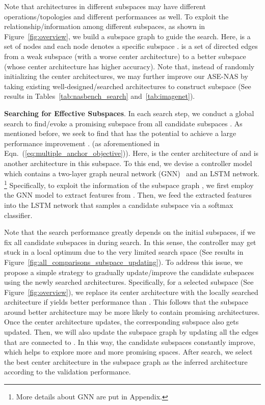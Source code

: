 \documentclass[lettersize,journal]{IEEEtran}
\newcommand{\sexyname}{ASE-NAS\xspace}
\begin{document}
Note that architectures in different subspaces may have different operations/topologies and different performances as well.
To exploit the relationship/information among different subspaces, as shown in Figure~\ref{fig:overview}, we build a subspace graph  to guide the search. 
Here,  is a set of nodes and each node denotes a specific subspace . 
 is a set of directed edges from a weak subspace (with a worse center architecture) to a better subspace (whose center architecture has higher accuracy). 
Note that, instead of randomly initializing the center architectures, we may further improve our \sexyname by taking existing well-designed/searched architectures to construct subspace (See results in Tables~\ref{tab:nasbench_search} and~\ref{tab:imagenet}).



\textbf{Searching for Effective Subspaces}.
In each search step, we conduct a global search to find/evoke a promising subspace  from all candidate subspaces . As mentioned before, we seek to find  that has the potential to achieve a large performance improvement . 
(as aforementioned in Eqn.~(\ref{eq:multiple_anchor_objective})). 
Here,  is the center architecture of  and  is another architecture in this subspace. To this end,  
we devise a controller model which contains a two-layer graph neural network (GNN)~\cite{you2020handling} and an LSTM network.
\footnote{More details about GNN are put in Appendix.}
Specifically, to exploit the information of the subspace graph ,
we first employ the GNN model to extract features from . Then, we feed the extracted features into the LSTM network that samples a candidate subspace  via a softmax classifier. 

Note that the search performance greatly depends on the initial subspaces, if we fix all candidate subspaces in  during search. In this sense, the controller may get stuck in a local optimum due to the very limited search space
(See results in Figure~\ref{fig:all_comparisons_subspace_updating}).
To address this issue, we propose a simple strategy to gradually update/improve the candidate subspaces  using the newly searched architectures.
Specifically, for a selected subspace  (See Figure~\ref{fig:overview}), we replace its center architecture  with the locally searched architecture  if  yields better performance than .
This follows that the subspace around better architecture may be more likely to contain promising architectures.
Once the center architecture updates, the corresponding subspace also gets updated.
Then, we will also update the subspace graph  by updating all the edges that are connected to . In this way, the candidate subspaces constantly improve, which helps to explore more and more promising spaces. After search, we select the best center architecture in the subspace graph as the inferred architecture according to the validation performance.
\end{document}

